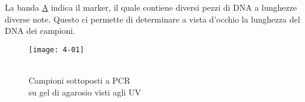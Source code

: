 La banda \hyperref[img:4-01]{A} indica il marker, il quale contiene diversi pezzi di DNA a lunghezze diverse note. Questo ci permette di determinare a vista d'occhio la lunghezza del DNA dei campioni.

\begin{figure}[H]
	\captionsetup{singlelinecheck=off}
	\centering
	\begin{annotatedFigure}
		{
			\texttt{[image: 4-01]}
		}
	\end{annotatedFigure}
	\caption{\\Campioni sottoposti a PCR\\ su gel di agarosio visti agli UV}\label{img:4-01}
\end{figure}